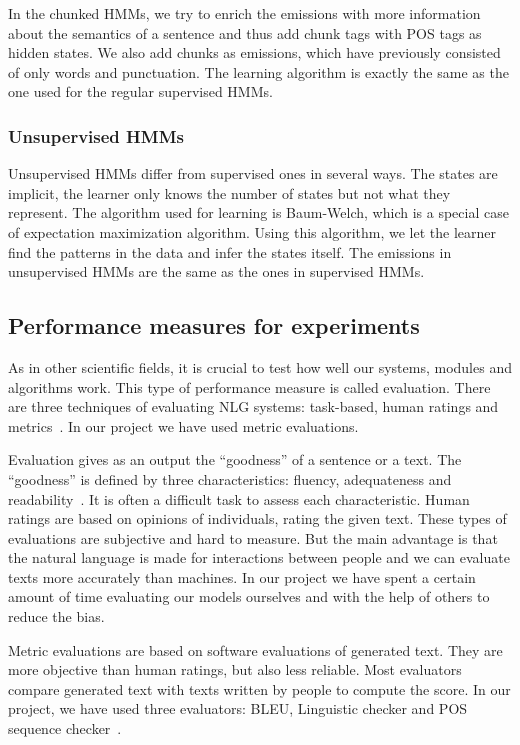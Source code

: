 \documentclass[a4paper,12pt]{article}
\begin{document}
In the chunked HMMs, we try to enrich the emissions with more
information about the semantics of a sentence and thus add chunk tags with POS
tags as hidden states. We also add chunks as emissions, which have previously
consisted of only words and punctuation. The learning algorithm is exactly the
same as the one used for the regular supervised HMMs.

\subsubsection{Unsupervised HMMs}
Unsupervised HMMs differ from supervised ones in several ways. The states are
implicit, the learner only knows the number of states but not what they
represent. The algorithm used for learning is Baum-Welch, which is a special
case of expectation maximization algorithm. Using this algorithm, we let the
learner find the patterns in the data and infer the states itself. The emissions
in unsupervised HMMs are the same as the ones in supervised HMMs.


\subsection {Performance measures for experiments}

As in other scientific fields, it is crucial to test how well our systems,
modules and algorithms work. This type of performance measure is called
evaluation. There are three techniques of evaluating NLG systems: task-based,
human ratings and metrics~\cite{evalnlg}. In our project we have used
metric evaluations.

Evaluation gives as an output the ``goodness'' of a sentence or a text. The
``goodness'' is defined by three characteristics: fluency, adequateness and
readability~\cite{evalmethods}. It is often a difficult task to assess each
characteristic.
Human ratings are based on opinions of individuals, rating the given
text. These types of evaluations are subjective and hard to measure. But the
main advantage is that the natural language is made for interactions between
people and we can evaluate texts more accurately than machines. In our project
we have spent a certain amount of time evaluating our models ourselves and with
the help of others to reduce the bias.

Metric evaluations are based on software evaluations of generated text. They are
more objective than human ratings, but also less reliable. Most evaluators
compare generated text with texts written by people to compute the score. In our
project, we have used three evaluators: BLEU, Linguistic checker and POS
sequence checker~\cite{autoeval}.
\end{document}

